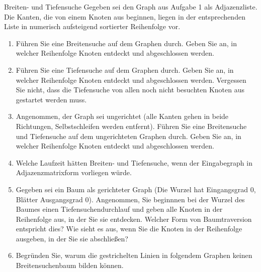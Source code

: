 \documentclass[11pt,a4paper]{article}
\begin{document}
\begin{aufgabe}{2}{Breiten- und Tiefensuche}
    Gegeben sei den Graph aus Aufgabe 1 als Adjazenzliste.
    Die Kanten, die von einem Knoten aus beginnen, liegen in der entsprechenden Liste in numerisch aufsteigend sortierter Reihenfolge vor.
    \begin{enumerate}
        \item Führen Sie eine Breitensuche auf dem Graphen durch.
        Geben Sie an, in welcher Reihenfolge Knoten ent\-deckt und abgeschlossen werden.
        \item Führen Sie eine Tiefensuche auf dem Graphen durch.
        Geben Sie an, in welcher Reihenfolge Knoten entdeckt und abgeschlossen werden. Vergessen Sie nicht, dass die Tiefensuche von allen noch nicht besuchten Knoten aus gestartet werden muss.
        \item Angenommen, der Graph sei ungerichtet (alle Kanten gehen in beide Richtungen, Selbstschleifen werden entfernt).
        Führen Sie eine Breitensuche und Tiefensuche auf dem ungerichteten Graphen durch.
        Geben Sie an, in welcher Reihenfolge Knoten entdeckt und abgeschlossen werden.
        \item Welche Laufzeit hätten Breiten- und Tiefensuche, wenn der Eingabegraph in Adjazenzmatrixform vorliegen würde.
        \item
        Gegeben sei ein Baum als gerichteter Graph (Die Wurzel hat Eingangsgrad 0, Blätter Ausgangsgrad 0).
        Angenommen, Sie beginnnen bei der Wurzel des Baumes einen Tiefensuchendurchlauf und geben alle Knoten in der Reihenfolge aus, in der Sie sie entdecken.
        Welcher Form von Baumtraversion entspricht dies?
        Wie sieht es aus, wenn Sie die Knoten in der Reihenfolge ausgeben, in der Sie sie abschließen?
        \item
        Begründen Sie, warum die gestrichelten Linien in folgendem Graphen keinen Breitensuchenbaum bilden können.
        \begin{figure}[h!]
            \centering
\end{figure}
\end{enumerate}
\end{aufgabe}
\end{document}

